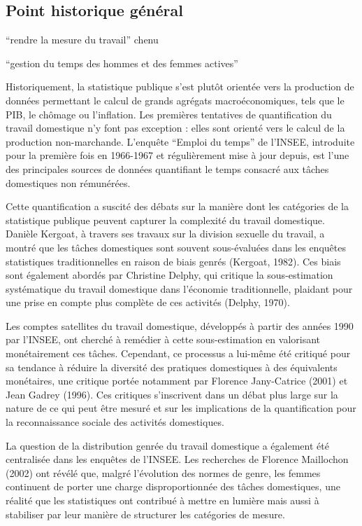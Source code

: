 \documentclass[
  12pt,
]{book}
\begin{document}
\subsection{Point historique
général}\label{point-historique-guxe9nuxe9ral}

``rendre la mesure du travail'' chenu

``gestion du temps des hommes et des femmes actives''

Historiquement, la statistique publique s'est plutôt orientée vers la
production de données permettant le calcul de grands agrégats
macroéconomiques, tels que le PIB, le chômage ou l'inflation. Les
premières tentatives de quantification du travail domestique n'y font
pas exception : elles sont orienté vers le calcul de la production
non-marchande. L'enquête ``Emploi du temps'' de l'INSEE, introduite pour
la première fois en 1966-1967 et régulièrement mise à jour depuis, est
l'une des principales sources de données quantifiant le temps consacré
aux tâches domestiques non rémunérées.

Cette quantification a suscité des débats sur la manière dont les
catégories de la statistique publique peuvent capturer la complexité du
travail domestique. Danièle Kergoat, à travers ses travaux sur la
division sexuelle du travail, a montré que les tâches domestiques sont
souvent sous-évaluées dans les enquêtes statistiques traditionnelles en
raison de biais genrés (Kergoat, 1982). Ces biais sont également abordés
par Christine Delphy, qui critique la sous-estimation systématique du
travail domestique dans l'économie traditionnelle, plaidant pour une
prise en compte plus complète de ces activités (Delphy, 1970).

Les comptes satellites du travail domestique, développés à partir des
années 1990 par l'INSEE, ont cherché à remédier à cette sous-estimation
en valorisant monétairement ces tâches. Cependant, ce processus a
lui-même été critiqué pour sa tendance à réduire la diversité des
pratiques domestiques à des équivalents monétaires, une critique portée
notamment par Florence Jany-Catrice (2001) et Jean Gadrey (1996). Ces
critiques s'inscrivent dans un débat plus large sur la nature de ce qui
peut être mesuré et sur les implications de la quantification pour la
reconnaissance sociale des activités domestiques.

La question de la distribution genrée du travail domestique a également
été centralisée dans les enquêtes de l'INSEE. Les recherches de Florence
Maillochon (2002) ont révélé que, malgré l'évolution des normes de
genre, les femmes continuent de porter une charge disproportionnée des
tâches domestiques, une réalité que les statistiques ont contribué à
mettre en lumière mais aussi à stabiliser par leur manière de structurer
les catégories de mesure.
\end{document}
